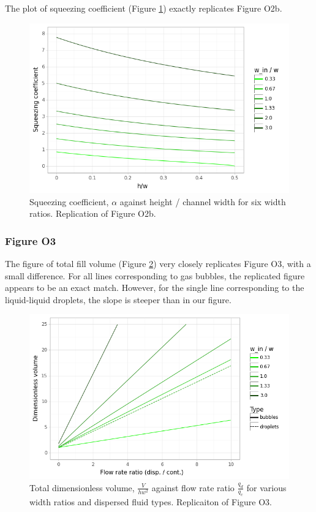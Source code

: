 The plot of squeezing coefficient (Figure \ref{fig2b}) exactly replicates Figure O2b.

\begin{figure}[ht]
  \centering
  \includegraphics[width=0.8\linewidth]{../figures/fig_2b.png}
  \caption{Squeezing coefficient, $\alpha$ against height / channel width
  for six width ratios. Replication of Figure O2b.}
  \label{fig2b}
\end{figure}

\subsubsection{Figure O3}

The figure of total fill volume (Figure \ref{fig3}) very closely replicates Figure O3, with a small
difference. For all lines corresponding to gas bubbles, the replicated figure appears to be
an exact match. However, for the single line corresponding to the liquid-liquid droplets, the
slope is steeper than in our figure.

\begin{figure}[ht]
  \centering
  \includegraphics[width=0.8\linewidth]{../figures/fig_3.png}
  \caption{Total dimensionless volume, $\frac{V}{hw^2}$ against flow rate ratio $\frac{q_d}{q_c}$
  for various width ratios and dispersed fluid types. Replicaiton of Figure O3.}
  \label{fig3}
\end{figure}


